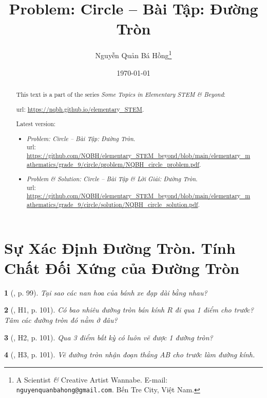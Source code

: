 \documentclass{article}
\title{Problem: Circle -- Bài Tập: Đường Tròn}
\author{Nguyễn Quản Bá Hồng\footnote{A Scientist {\it\&} Creative Artist Wannabe. E-mail: {\tt nguyenquanbahong@gmail.com}. Bến Tre City, Việt Nam.}}
\date{\today}
\newtheorem{baitoan}{}
\begin{document}
\maketitle
\begin{abstract}
	This text is a part of the series {\it Some Topics in Elementary STEM \& Beyond}:
	
	{\sc url}: \url{https://nqbh.github.io/elementary_STEM}.
	
	Latest version:
	\begin{itemize}
		\item \textit{Problem: Circle -- Bài Tập: Đường Tròn}.\\{\sc url}: \url{https://github.com/NQBH/elementary_STEM_beyond/blob/main/elementary_mathematics/grade_9/circle/problem/NQBH_circle_problem.pdf}.
		\item \textit{Problem \& Solution: Circle -- Bài Tập \& Lời Giải: Đường Tròn}.\\{\sc url}: \url{https://github.com/NQBH/elementary_STEM_beyond/blob/main/elementary_mathematics/grade_9/circle/solution/NQBH_circle_solution.pdf}.
	\end{itemize}
\end{abstract}
\tableofcontents


\section{Sự Xác Định Đường Tròn. Tính Chất Đối Xứng của Đường Tròn}

\begin{baitoan}[\cite{Binh_boi_duong_Toan_9_tap_1}, p. 99]
	Tại sao các nan hoa của bánh xe đạp dài bằng nhau?
\end{baitoan}

\begin{baitoan}[\cite{Binh_boi_duong_Toan_9_tap_1}, H1, p. 101]
	Có bao nhiêu đường tròn bán kính $R$ đi qua 1 điểm cho trước? Tâm các đường tròn đó nằm ở đâu?
\end{baitoan}

\begin{baitoan}[\cite{Binh_boi_duong_Toan_9_tap_1}, H2, p. 101]
	Qua 3 điểm bất kỳ có luôn vẽ được 1 đường tròn?
\end{baitoan}

\begin{baitoan}[\cite{Binh_boi_duong_Toan_9_tap_1}, H3, p. 101]
	Vẽ đường tròn nhận đoạn thẳng AB cho trước làm đường kính.
\end{baitoan}
\end{document}
